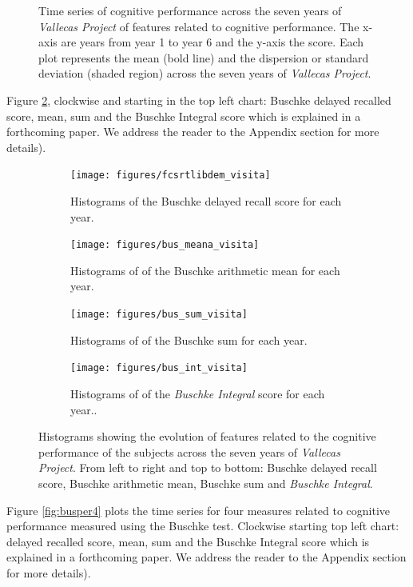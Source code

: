 \documentclass[11pt]{article}
\theoremstyle{definition}
\theoremstyle{remark}
\begin{document}
\begin{figure}[H]
    \caption{Time series of cognitive performance across the seven years of \emph{Vallecas Project} of features related to cognitive performance. The x-axis are years from year 1 to year 6 and the y-axis the score. Each plot represents the mean (bold line) and the dispersion or standard deviation (shaded region) across the seven years of \emph{Vallecas Project}.}
    \label{fig:cogper4}
\end{figure}

Figure \ref{fig:cogperyearsbus}, clockwise and starting in the top left chart: Buschke delayed recalled score, mean, sum and the Buschke Integral score which is explained in a forthcoming paper. We address the reader to the Appendix section for more details).

\begin{figure}[H]
    \centering
    \begin{subfigure}[t]{0.4\textwidth}
        \centering
        \texttt{[image: figures/fcsrtlibdem\_visita]}
        \caption{Histograms of the Buschke delayed recall score for each year.}
    \end{subfigure}
    \hfill
    \begin{subfigure}[t]{0.4\textwidth}
        \centering
        \texttt{[image: figures/bus\_meana\_visita]}
        \caption{Histograms of of the Buschke arithmetic mean for each year.}
    \end{subfigure}%
    
     \begin{subfigure}[t]{0.4\textwidth}
        \centering
        \texttt{[image: figures/bus\_sum\_visita]}
        \caption{Histograms of of the Buschke sum for each year.}
    \end{subfigure}
    \hfill
    \begin{subfigure}[t]{0.4\textwidth}
        \centering
        \texttt{[image: figures/bus\_int\_visita]}
        \caption{Histograms of of the \emph{Buschke Integral} score for each year..}
    \end{subfigure}%
   
    \caption{Histograms showing the evolution of features related to the cognitive performance of the subjects across the seven years of \emph{Vallecas Project}. From left to right and top to bottom: 
    Buschke delayed recall score, Buschke arithmetic mean, Buschke sum and \emph{Buschke Integral}.}
    \label{fig:cogperyearsbus}
\end{figure}

Figure \ref{fig:busper4} plots the time series for four measures related to cognitive performance measured using the Buschke test. Clockwise starting top left chart: delayed recalled score, mean, sum and the Buschke Integral score which is explained in a forthcoming paper. We address the reader to the Appendix section for more details).
\end{document}
